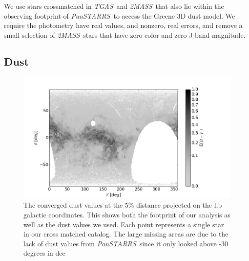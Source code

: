 \documentclass[modern]{aastex61}
\newcommand\BLcomment[1]{{\color{cyan}{[BL: #1]}}}
\newcommand{\acronym}[1]{{\small{#1}}}
\newcommand{\project}[1]{\textsl{#1}}
\newcommand{\tgas}{\project{\acronym{TGAS}}}
\newcommand{\tmass}{\project{\acronym{2MASS}}}
\newcommand{\panstarrs}{\project{Pan\acronym{STARRS}}}
\begin{document}
We use stars crossmatched in \tgas\ and \tmass\, that also lie within the observing footprint of \panstarrs\ to access the Greene 3D dust model. We require the photometry have real values, and nonzero, real errors, and remove a small selection of \tmass\ stars that have zero color and zero J band magnitude.

\BLcomment{Needs to say much more - unfortunately I cannot complete this part since I don't know what you've done in enough detail.}

\subsection{Dust}

\begin{figure}
\centering
  \includegraphics[width=\textwidth]{dust.png}
\caption{The converged dust values at the 5\% distance projected on the l,b galactic coordinates. This shows both the footprint of our analysis as well as the dust values we used. Each point represents a single star in our cross matched catalog. The large missing areas are due to the lack of dust values from \panstarrs\ since it only looked above -30 degrees in dec }
\label{fig:dust}
\end{figure}
\end{document}
